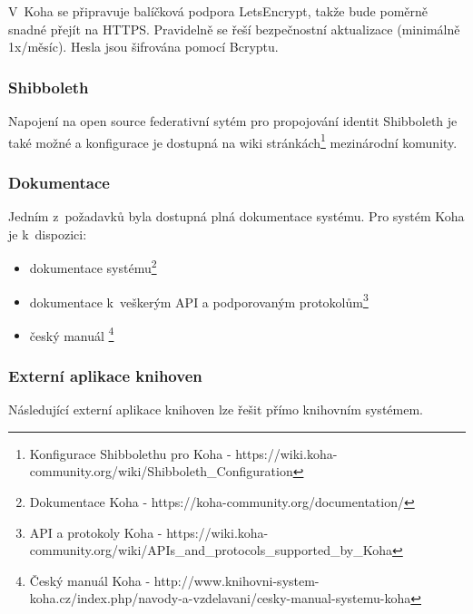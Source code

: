 \documentclass[
	11pt, oneside, printed, draft, 
	table,   %
	lof,     %
	lot     %
]{fithesis3}
\begin{document}
{V~Koha se připravuje balíčková podpora LetsEncrypt, takže bude poměrně snadné přejít na HTTPS. Pravidelně se řeší bezpečnostní aktualizace (minimálně 1x/měsíc). Hesla jsou šifrována pomocí Bcryptu.

\subsubsection{Shibboleth}
Napojení na open source federativní sytém pro propojování identit Shibboleth je také možné a konfigurace je dostupná na wiki stránkách\footnote{Konfigurace Shibbolethu pro Koha - https://wiki.koha-community.org/wiki/Shibboleth\_Configuration} mezinárodní komunity.

\subsubsection{Dokumentace}
Jedním z~požadavků byla dostupná plná dokumentace systému. Pro systém Koha je k~dispozici:

\begin{itemize}
\item dokumentace systému\footnote{Dokumentace Koha - https://koha-community.org/documentation/}
\item dokumentace k~veškerým API a podporovaným protokolům\footnote{API a protokoly Koha - https://wiki.koha-community.org/wiki/APIs\_and\_protocols\_supported\_by\_Koha}
\item český manuál \footnote{Český manuál Koha - http://www.knihovni-system-koha.cz/index.php/navody-a-vzdelavani/cesky-manual-systemu-koha}
\end{itemize}

\subsubsection{Externí aplikace knihoven}
Následující externí aplikace knihoven lze řešit přímo knihovním systémem.

}
\end{document}
